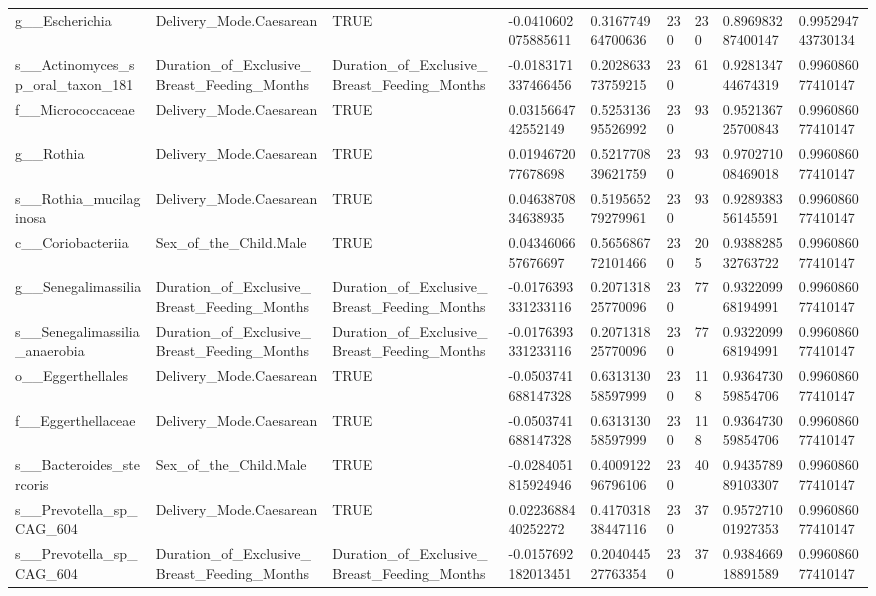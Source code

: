 \begin{longtable}{lllllllll}
g\_\_Escherichia & Delivery\_Mode.Caesarean & TRUE & -0.0410602075885611 & 0.316774964700636 & 230 & 230 & 0.896983287400147 & 0.995294743730134 \\
s\_\_Actinomyces\_sp\_oral\_taxon\_181 & Duration\_of\_Exclusive\_Breast\_Feeding\_Months & Duration\_of\_Exclusive\_Breast\_Feeding\_Months & -0.0183171337466456 & 0.202863373759215 & 230 & 61 & 0.928134744674319 & 0.996086077410147 \\
f\_\_Micrococcaceae & Delivery\_Mode.Caesarean & TRUE & 0.0315664742552149 & 0.525313695526992 & 230 & 93 & 0.952136725700843 & 0.996086077410147 \\
g\_\_Rothia & Delivery\_Mode.Caesarean & TRUE & 0.0194672077678698 & 0.521770839621759 & 230 & 93 & 0.970271008469018 & 0.996086077410147 \\
s\_\_Rothia\_mucilaginosa & Delivery\_Mode.Caesarean & TRUE & 0.0463870834638935 & 0.519565279279961 & 230 & 93 & 0.928938356145591 & 0.996086077410147 \\
c\_\_Coriobacteriia & Sex\_of\_the\_Child.Male & TRUE & 0.0434606657676697 & 0.565686772101466 & 230 & 205 & 0.938828532763722 & 0.996086077410147 \\
g\_\_Senegalimassilia & Duration\_of\_Exclusive\_Breast\_Feeding\_Months & Duration\_of\_Exclusive\_Breast\_Feeding\_Months & -0.0176393331233116 & 0.207131825770096 & 230 & 77 & 0.932209968194991 & 0.996086077410147 \\
s\_\_Senegalimassilia\_anaerobia & Duration\_of\_Exclusive\_Breast\_Feeding\_Months & Duration\_of\_Exclusive\_Breast\_Feeding\_Months & -0.0176393331233116 & 0.207131825770096 & 230 & 77 & 0.932209968194991 & 0.996086077410147 \\
o\_\_Eggerthellales & Delivery\_Mode.Caesarean & TRUE & -0.0503741688147328 & 0.631313058597999 & 230 & 118 & 0.936473059854706 & 0.996086077410147 \\
f\_\_Eggerthellaceae & Delivery\_Mode.Caesarean & TRUE & -0.0503741688147328 & 0.631313058597999 & 230 & 118 & 0.936473059854706 & 0.996086077410147 \\
s\_\_Bacteroides\_stercoris & Sex\_of\_the\_Child.Male & TRUE & -0.0284051815924946 & 0.400912296796106 & 230 & 40 & 0.943578989103307 & 0.996086077410147 \\
s\_\_Prevotella\_sp\_CAG\_604 & Delivery\_Mode.Caesarean & TRUE & 0.0223688440252272 & 0.417031838447116 & 230 & 37 & 0.957271001927353 & 0.996086077410147 \\
s\_\_Prevotella\_sp\_CAG\_604 & Duration\_of\_Exclusive\_Breast\_Feeding\_Months & Duration\_of\_Exclusive\_Breast\_Feeding\_Months & -0.0157692182013451 & 0.204044527763354 & 230 & 37 & 0.938466918891589 & 0.996086077410147 \\

\end{longtable}
